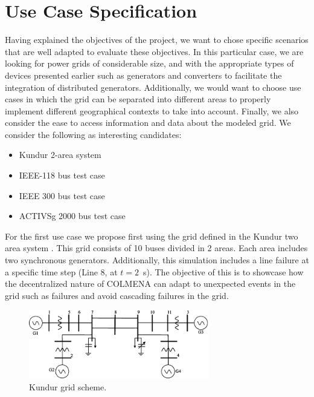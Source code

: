 \documentclass{article}
\begin{document}
\section{Use Case Specification}

Having explained the objectives of the project, we want to chose specific scenarios that are well adapted to evaluate these objectives. In this particular case, we are looking for power grids of considerable size, and with the appropriate types of devices presented earlier such as generators and converters to facilitate the integration of distributed generators. Additionally, we would want to choose use cases in which the grid can be separated into different areas to properly implement different geographical contexts to take into account. Finally, we also consider the ease to access information and data about the modeled grid. We consider the following as interesting candidates: 

\begin{itemize}
    \item Kundur 2-area system \cite{grids:kundur}
    \item IEEE-118 bus test case \cite{grids:ieee118} 
    \item IEEE 300 bus test case  \cite{grids:ieee300} 
    \item ACTIVSg 2000 bus test case  \cite{grids:activsg2000} 
\end{itemize}


For the first use case we propose first using the grid defined in the Kundur two area system  \cite{grids:kundur}. This grid consists of 10 buses divided in 2 areas. Each area includes two synchronous generators. Additionally, this simulation includes a line failure at a specific time step (Line 8, at $t=2$~s). The objective of this is to showcase how the decentralized nature of COLMENA can adapt to unexpected events in the grid such as failures and avoid cascading failures in the grid. 

\begin{figure}[!htb]
    \centering
    \includegraphics[width=0.7\textwidth]{pictures/kundurgrid.png}
    \caption{Kundur grid scheme. \cite{grids:kundur}}
    \label{fig:kundur2}
\end{figure}
\end{document}
